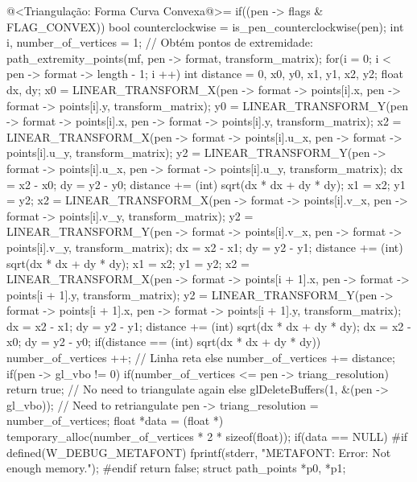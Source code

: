{\iniciocodigo
@<Triangulação: Forma Curva Convexa@>=
if((pen -> flags & FLAG_CONVEX)){
  bool counterclockwise = is_pen_counterclockwise(pen);
  int i, number_of_vertices = 1;
  // Obtém pontos de extremidade:
  path_extremity_points(mf, pen -> format, transform_matrix);
  for(i = 0; i < pen -> format -> length - 1; i ++){
    int distance = 0, x0, y0, x1, y1, x2, y2;
    float dx, dy;
    x0 = LINEAR_TRANSFORM_X(pen -> format -> points[i].x,
                            pen -> format -> points[i].y, transform_matrix);
    y0 = LINEAR_TRANSFORM_Y(pen -> format -> points[i].x,
                            pen -> format -> points[i].y, transform_matrix);
    x2 = LINEAR_TRANSFORM_X(pen -> format -> points[i].u_x,
                            pen -> format -> points[i].u_y, transform_matrix);
    y2 = LINEAR_TRANSFORM_Y(pen -> format -> points[i].u_x,
                            pen -> format -> points[i].u_y, transform_matrix);
    dx = x2 - x0;
    dy = y2 - y0;
    distance += (int) sqrt(dx * dx + dy * dy);
    x1 = x2;
    y1 = y2;
    x2 = LINEAR_TRANSFORM_X(pen -> format -> points[i].v_x,
                            pen -> format -> points[i].v_y, transform_matrix);
    y2 = LINEAR_TRANSFORM_Y(pen -> format -> points[i].v_x,
                            pen -> format -> points[i].v_y, transform_matrix);
    dx = x2 - x1;
    dy = y2 - y1;
    distance += (int) sqrt(dx * dx + dy * dy);
    x1 = x2;
    y1 = y2;
    x2 = LINEAR_TRANSFORM_X(pen -> format -> points[i + 1].x,
                            pen -> format -> points[i + 1].y,
                            transform_matrix);
    y2 = LINEAR_TRANSFORM_Y(pen -> format -> points[i + 1].x,
                            pen -> format -> points[i + 1].y,
                            transform_matrix);
    dx = x2 - x1;
    dy = y2 - y1;
    distance += (int) sqrt(dx * dx + dy * dy);
    dx = x2 - x0;
    dy = y2 - y0;
    if(distance == (int) sqrt(dx * dx + dy * dy))
      number_of_vertices ++; // Linha reta
    else
      number_of_vertices += distance;
  }
  if(pen -> gl_vbo != 0){
    if(number_of_vertices <= pen -> triang_resolution)
      return true; // No need to triangulate again
    else
      glDeleteBuffers(1, &(pen -> gl_vbo)); // Need to retriangulate
  }
  pen -> triang_resolution = number_of_vertices;
  float *data = (float *) temporary_alloc(number_of_vertices * 2 *
                                          sizeof(float));
    if(data == NULL){
#if defined(W_DEBUG_METAFONT)
    fprintf(stderr, "METAFONT: Error: Not enough memory.\n");
#endif
    return false;
  }
  {
    struct path_points *p0, *p1;
}}}
